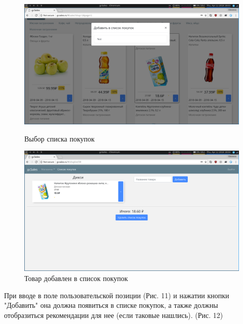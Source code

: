 \begin{figure}[H]
    \centering
    \includegraphics[width=\textwidth]{./screenshots/choose_shoplist.png}
    \caption{Выбор списка покупок}
    \endminipage
    \includegraphics[width=\textwidth]{./screenshots/item_added.png}
    \caption{Товар добавлен в список покупок}
    \endminipage
\end{figure}

При вводе в поле пользовательской позиции (Рис. 11) и нажатии кнопки "Добавить"
она должна появиться в списке покупок, а также должны отобразиться рекомендации
для нее (если таковые нашлись). (Рис. 12)

